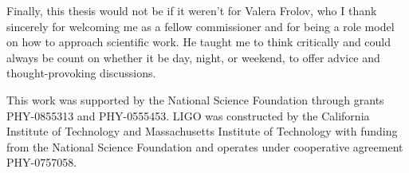 {Finally, this thesis would not be if it weren't for Valera Frolov, who
I thank sincerely for welcoming me as a fellow commissioner and for
being a role model on how to approach scientific work. He taught me to
think critically and could always be count on whether it be day,
night, or weekend, to offer advice and thought-provoking discussions.

This work was supported by the National Science Foundation through
grants PHY-0855313 and PHY-0555453. LIGO was constructed by the
California Institute of Technology and Massachusetts Institute of
Technology with funding from the National Science Foundation and
operates under cooperative agreement PHY-0757058.
}

